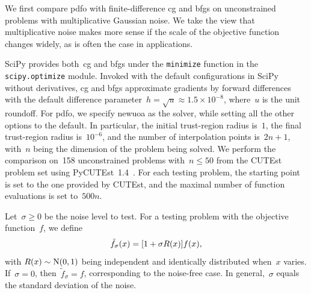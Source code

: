 \documentclass[
    smallextended,  %
    draft,          %
    final,          %
]{svjour3}
\newcommand{\NN}{\mathrm{N}}
\newcommand{\iter}[1][k]{x\ifthenelse{\equal{#1}{}}{}{_{#1}}}
\newcommand{\obj}{f}
\begin{document}
We first compare \gls{pdfo} with finite-difference \gls{cg} and \gls{bfgs} on unconstrained
problems with multiplicative Gaussian noise.
We take the view that multiplicative noise makes more sense if the scale of the objective
function changes widely, as is often the case in applications.

SciPy provides both~\gls{cg} and \gls{bfgs} under the \texttt{minimize} function in the \texttt{scipy.optimize} module.
Invoked with the default configurations in SciPy without derivatives,
\gls{cg} and \gls{bfgs} approximate gradients by forward differences with the default difference
parameter~$h = \sqrt{u} \approx 1.5\times 10^{-8}$, where~$u$ is the unit roundoff.
For \gls{pdfo}, we specify \gls{newuoa} as the solver, while setting all the other options to the default.
In particular, the initial trust-region radius is~$1$, the final trust-region radius is~$10^{-6}$,
and the number of interpolation points is~$2n + 1$, with~$n$ being the dimension of the problem
being solved.
We perform the comparison on~158 unconstrained problems with~$n \le 50$ from the
CUTEst~\cite{Gould_Orban_Toint_2015} problem set using PyCUTEst~1.4~\cite{Fowkes_Roberts_Burmen_2022}.
For each testing problem, the starting point is set to the one provided by CUTEst, and the maximal
number of function evaluations is set to~$500n$.

Let~$\sigma \ge 0$ be the noise level to test.
For a testing problem with the objective function~$\obj$, we define
\begin{equation}
    \label{eq:noisy-obj}
    \tilde{\obj}_\sigma(\iter[]) = [1 + \sigma R(\iter[])] \obj(\iter[]),
\end{equation}
with $R(\iter[])\sim \NN(0, 1)$ being independent and identically distributed when~$x$ varies.
If~$\sigma = 0$, then~$\tilde{f}_\sigma = f$, corresponding to the noise-free case.
In general,~$\sigma$ equals the standard deviation of the noise.
\end{document}
